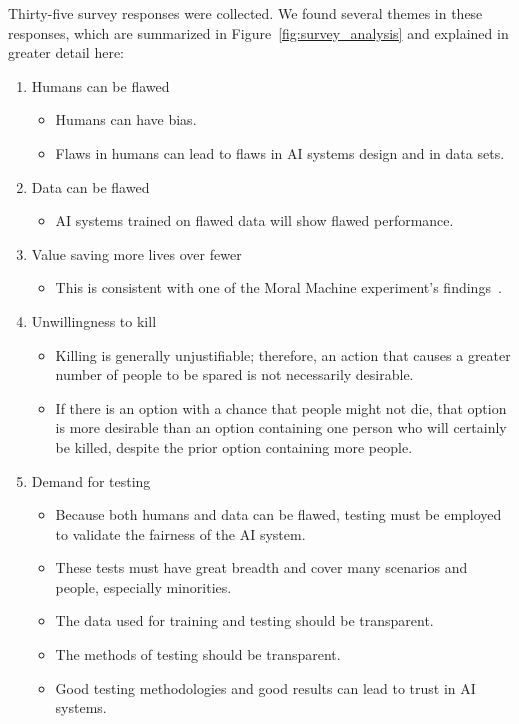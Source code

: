 \documentclass[]{report}
\begin{document}
Thirty-five survey responses were collected. We found several themes in these responses, which are
summarized in Figure~\ref{fig:survey_analysis} and explained in greater detail here:
\begin{enumerate}
    \item Humans can be flawed
    \begin{itemize}
        \item Humans can have bias.
        \item Flaws in humans can lead to flaws in AI systems design and in data sets.
    \end{itemize}
    
    \item Data can be flawed
    \begin{itemize}
        \item AI systems trained on flawed data will show flawed performance.
    \end{itemize}
    
    \item Value saving more lives over fewer
    \begin{itemize}
        \item This is consistent with one of the Moral Machine experiment's
        findings~\cite{awad2018moral}.
    \end{itemize}
    
    \item Unwillingness to kill
    \begin{itemize}
        \item Killing is generally unjustifiable; therefore, an action that causes a greater number
        of people to be spared is not necessarily desirable.
        \item If there is an option with a chance that people might not die, that option is more
        desirable than an option containing one person who will certainly be killed, despite the
        prior option containing more people.
    \end{itemize}
    
    \item Demand for testing
    \begin{itemize}
        \item Because both humans and data can be flawed, testing must be employed to validate the
        fairness of the AI system.
        \item These tests must have great breadth and cover many scenarios and people, especially
        minorities.
        \item The data used for training and testing should be transparent.
        \item The methods of testing should be transparent.
        \item Good testing methodologies and good results can lead to trust in AI systems.
    \end{itemize}
\end{enumerate}
\end{document}
